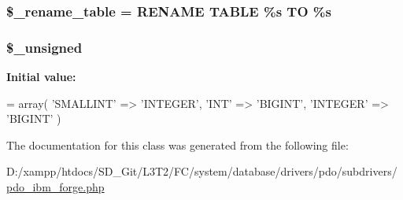 \subsubsection[{\$\+\_\+rename\+\_\+table}]{\setlength{\rightskip}{0pt plus 5cm}\$\+\_\+rename\+\_\+table = \textquotesingle{}R\+E\+N\+A\+M\+E T\+A\+B\+L\+E \%s T\+O \%s\textquotesingle{}\hspace{0.3cm}{\ttfamily [protected]}}\label{class_c_i___d_b__pdo__ibm__forge_a1a649e7cf9de16bcf932977b18bc91de}
\hypertarget{class_c_i___d_b__pdo__ibm__forge_aae977ae6d61fa183f0b25422b6ddc31c}{}
\subsubsection[{\$\+\_\+unsigned}]{\setlength{\rightskip}{0pt plus 5cm}\$\+\_\+unsigned\hspace{0.3cm}{\ttfamily [protected]}}\label{class_c_i___d_b__pdo__ibm__forge_aae977ae6d61fa183f0b25422b6ddc31c}
{\bfseries Initial value\+:}
\begin{DoxyCode}
= array(
        \textcolor{stringliteral}{'SMALLINT'}  => \textcolor{stringliteral}{'INTEGER'},
        \textcolor{stringliteral}{'INT'}       => \textcolor{stringliteral}{'BIGINT'},
        \textcolor{stringliteral}{'INTEGER'}   => \textcolor{stringliteral}{'BIGINT'}
    )
\end{DoxyCode}


The documentation for this class was generated from the following file\+:\begin{DoxyCompactItemize}
\item 
D\+:/xampp/htdocs/\+S\+D\+\_\+\+Git/\+L3\+T2/\+F\+C/system/database/drivers/pdo/subdrivers/\hyperlink{pdo__ibm__forge_8php}{pdo\+\_\+ibm\+\_\+forge.\+php}\end{DoxyCompactItemize}

